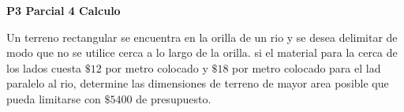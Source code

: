 \documentclass[11pt,a4paper]{article}
\begin{document}
\begin{center}
    \huge \textbf{P3 Parcial 4 Calculo}
    \end{center}
    \begin{center}
\end{center}

\begin{flushleft}

    Un terreno rectangular se encuentra en la orilla de un rio y se desea delimitar de modo que no se utilice cerca a lo largo de la orilla.
    si el material para la cerca de los lados cuesta $\$12$ por metro colocado y $\$18$ por metro colocado para el lad paralelo al rio, 
    determine las dimensiones de terreno de mayor area posible que pueda limitarse con $\$5400$ de presupuesto.
\\~\\
    \begin{minipage}{0.3\textwidth}
        \centering
        \begin{flushright}
        

\end{flushright}
\end{minipage}
\end{flushleft}
\end{document}
